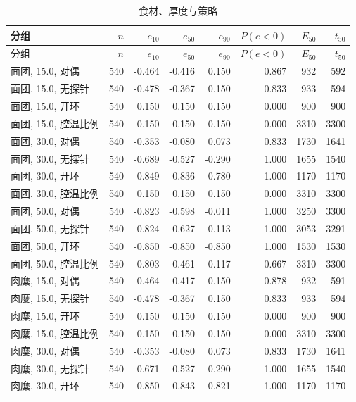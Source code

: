 \begin{longtable}{lrrrrrrr}
\caption{食材、厚度与策略}\\
\toprule
分组 & $n$ & $e_{10}$ & $e_{50}$ & $e_{90}$ & $P(e{<}0)$ & $E_{50}$ & $t_{50}$ \\
\midrule
\endfirsthead
\toprule
分组 & $n$ & $e_{10}$ & $e_{50}$ & $e_{90}$ & $P(e{<}0)$ & $E_{50}$ & $t_{50}$ \\
\midrule
\endhead
面团, 15.0, 对偶 & 540 & -0.464 & -0.416 & 0.150 & 0.867 & 932 & 592 \\
面团, 15.0, 无探针 & 540 & -0.478 & -0.367 & 0.150 & 0.833 & 933 & 594 \\
面团, 15.0, 开环 & 540 & 0.150 & 0.150 & 0.150 & 0.000 & 900 & 900 \\
面团, 15.0, 腔温比例 & 540 & 0.150 & 0.150 & 0.150 & 0.000 & 3310 & 3300 \\
面团, 30.0, 对偶 & 540 & -0.353 & -0.080 & 0.073 & 0.833 & 1730 & 1641 \\
面团, 30.0, 无探针 & 540 & -0.689 & -0.527 & -0.290 & 1.000 & 1655 & 1540 \\
面团, 30.0, 开环 & 540 & -0.849 & -0.836 & -0.780 & 1.000 & 1170 & 1170 \\
面团, 30.0, 腔温比例 & 540 & 0.150 & 0.150 & 0.150 & 0.000 & 3310 & 3300 \\
面团, 50.0, 对偶 & 540 & -0.823 & -0.598 & -0.011 & 1.000 & 3250 & 3300 \\
面团, 50.0, 无探针 & 540 & -0.824 & -0.627 & -0.113 & 1.000 & 3053 & 3291 \\
面团, 50.0, 开环 & 540 & -0.850 & -0.850 & -0.850 & 1.000 & 1530 & 1530 \\
面团, 50.0, 腔温比例 & 540 & -0.803 & -0.461 & 0.117 & 0.667 & 3310 & 3300 \\
肉糜, 15.0, 对偶 & 540 & -0.464 & -0.417 & 0.150 & 0.878 & 932 & 591 \\
肉糜, 15.0, 无探针 & 540 & -0.478 & -0.367 & 0.150 & 0.833 & 933 & 594 \\
肉糜, 15.0, 开环 & 540 & 0.150 & 0.150 & 0.150 & 0.000 & 900 & 900 \\
肉糜, 15.0, 腔温比例 & 540 & 0.150 & 0.150 & 0.150 & 0.000 & 3310 & 3300 \\
肉糜, 30.0, 对偶 & 540 & -0.353 & -0.080 & 0.073 & 0.833 & 1730 & 1641 \\
肉糜, 30.0, 无探针 & 540 & -0.671 & -0.527 & -0.290 & 1.000 & 1655 & 1540 \\
肉糜, 30.0, 开环 & 540 & -0.850 & -0.843 & -0.821 & 1.000 & 1170 & 1170 \\

\end{longtable}
